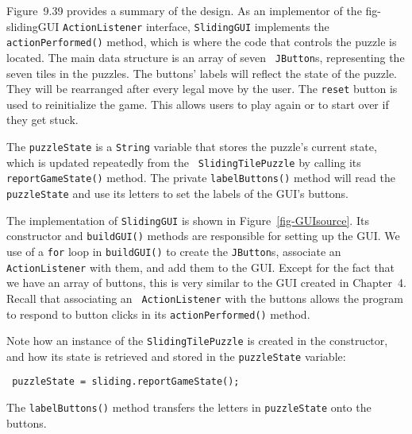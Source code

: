 Figure~9.39 provides a summary of the design. As an implementor of the
{fig-slidingGUI}
{\tt ActionListener} interface, {\tt SlidingGUI} implements the {\tt
actionPerformed()} method, which is where the code that controls the
puzzle is located.  The main data structure is an array of seven {\tt
JButton}s, representing the seven tiles in the puzzles. The buttons'
labels will reflect the state of the puzzle.  They will be rearranged
after every legal move by the user. The {\tt reset} button is used to
reinitialize the game. This allows users to play again or to start
over if they get stuck.

The {\tt puzzleState} is a {\tt String} variable that stores the
puzzle's current state, which is updated repeatedly from the {\tt
SlidingTilePuzzle} by calling its {\tt reportGameState()} method.  The
private {\tt labelButtons()} method will read the {\tt puzzleState}
and use its letters to set the labels of the GUI's buttons.

The implementation of {\tt SlidingGUI} is shown in
Figure~\ref{fig-GUIsource}.  Its constructor and {\tt buildGUI()}
methods are responsible for setting up the GUI. We use of a {\tt for}
loop in {\tt buildGUI()} to create the {\tt JButton}s, associate an
{\tt ActionListener} with them, and add them to the GUI. Except for
the fact that we have an array of buttons, this is very similar to the
GUI created in Chapter~4. Recall that associating an {\tt
ActionListener} with the buttons allows the program to respond to
button clicks in its {\tt actionPerformed()} method.

Note how an instance of the {\tt SlidingTilePuzzle} is created in
the constructor, and how its state is retrieved and stored in
the {\tt puzzleState} variable:

\begin{jjjlisting}
\begin{lstlisting}
 puzzleState = sliding.reportGameState();
\end{lstlisting}
\end{jjjlisting}

\noindent The {\tt labelButtons()} method transfers the
letters in {\tt puzzleState} onto the buttons.

